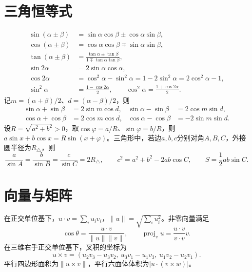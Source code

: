\section{三角恒等式}
\begin{equation*}
 \begin{aligned}
 \sin(\alpha\pm\beta)&=\sin\alpha\cos\beta\pm\cos\alpha\sin\beta,\\
 \cos(\alpha\pm\beta)&=\cos\alpha\cos\beta\mp\sin\alpha\sin\beta,\\
 \tan(\alpha\pm\beta)&=\frac{\tan\alpha\pm\tan\beta}{1\mp\tan\alpha\tan\beta},\\
 \sin2\alpha&=2\sin\alpha\cos\alpha,\\
 \cos2\alpha&=\cos^2\alpha-\sin^2\alpha=1-2\sin^2\alpha=2\cos^2\alpha-1,\\
 \sin^2\alpha&=\frac{1-\cos2\alpha}2,\qquad
 \cos^2\alpha=\frac{1+\cos2\alpha}2.
 \end{aligned}
\end{equation*}
记\(m=(\alpha+\beta)/2\)、\(d=(\alpha-\beta)/2\)，则
\begin{equation*}
 \begin{aligned}
 \sin\alpha+\sin\beta&=2\sin m\cos d,&
 \sin\alpha-\sin\beta&=2\cos m\sin d,\\
 \cos\alpha+\cos\beta&=2\cos m\cos d,&
 \cos\alpha-\cos\beta&=-2\sin m\sin d.
 \end{aligned}
\end{equation*}
设\(R=\sqrt{a^2+b^2}>0\)，取\(\cos\varphi=a/R\)、\(\sin\varphi=b/R\)，则\(a\sin x+b\cos x=R\sin(x+\varphi)\)。三角形中，若边\(a,b,c\)分别对角\(A,B,C\)，外接圆半径为\(R_\triangle\)，则
\begin{equation*}
 \frac a{\sin A}=\frac b{\sin B}=\frac c{\sin C}=2R_\triangle,\qquad
 c^2=a^2+b^2-2ab\cos C,\qquad S=\frac12ab\sin C.
\end{equation*}

\section{向量与矩阵}

在正交单位基下，\(u\cdot v=\sum_i u_iv_i\)，\(\|u\|=\sqrt{\sum_i u_i^2}\)。非零向量满足
\begin{equation*}
 \cos\theta=\frac{u\cdot v}{\|u\|\|v\|},\qquad
 \operatorname{proj}_v u=\frac{u\cdot v}{v\cdot v}v.
\end{equation*}
在三维右手正交单位基下，叉积的坐标为
\begin{equation*}
 u\times v=(u_2v_3-u_3v_2,\ u_3v_1-u_1v_3,\ u_1v_2-u_2v_1).
\end{equation*}
平行四边形面积为\(\|u\times v\|\)，平行六面体体积为\(|u\cdot(v\times w)|\)。

